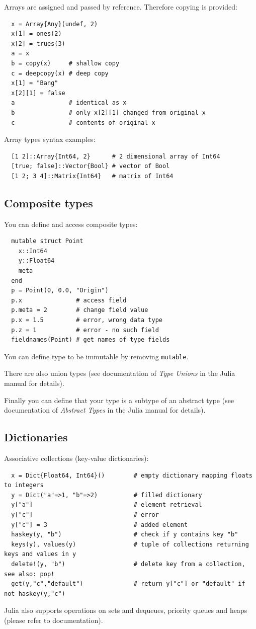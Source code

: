 \documentclass[10pt,a4paper]{article}
\begin{document}
Arrays are assigned and passed by reference. Therefore copying is provided:
\begin{lstlisting}
  x = Array{Any}(undef, 2)
  x[1] = ones(2)
  x[2] = trues(3)
  a = x
  b = copy(x)     # shallow copy
  c = deepcopy(x) # deep copy
  x[1] = "Bang"
  x[2][1] = false
  a               # identical as x
  b               # only x[2][1] changed from original x
  c               # contents of original x
\end{lstlisting}

Array types syntax examples:
\begin{lstlisting}
  [1 2]::Array{Int64, 2}      # 2 dimensional array of Int64
  [true; false]::Vector{Bool} # vector of Bool
  [1 2; 3 4]::Matrix{Int64}   # matrix of Int64
\end{lstlisting}

\subsection{Composite types}
You can define and access composite types:
\begin{lstlisting}
  mutable struct Point
    x::Int64
    y::Float64
    meta
  end
  p = Point(0, 0.0, "Origin")
  p.x               # access field
  p.meta = 2        # change field value
  p.x = 1.5         # error, wrong data type
  p.z = 1           # error - no such field
  fieldnames(Point) # get names of type fields
\end{lstlisting}
You can define type to be immutable by removing \lstinline|mutable|.

There are also union types (see documentation of \emph{Type Unions} in the Julia manual for details).

Finally you can define that your type is a subtype of an abstract type (see documentation of \emph{Abstract Types} in the Julia manual for details).

\subsection{Dictionaries}
Associative collections (key-value dictionaries):
\begin{lstlisting}
  x = Dict{Float64, Int64}()        # empty dictionary mapping floats to integers
  y = Dict("a"=>1, "b"=>2)          # filled dictionary
  y["a"]                            # element retrieval
  y["c"]                            # error
  y["c"] = 3                        # added element
  haskey(y, "b")                    # check if y contains key "b"
  keys(y), values(y)                # tuple of collections returning keys and values in y
  delete!(y, "b")                   # delete key from a collection, see also: pop!
  get(y,"c","default")              # return y["c"] or "default" if not haskey(y,"c")
\end{lstlisting}
Julia also supports operations on sets and dequeues, priority queues and heaps (please refer to documentation).
\end{document}
